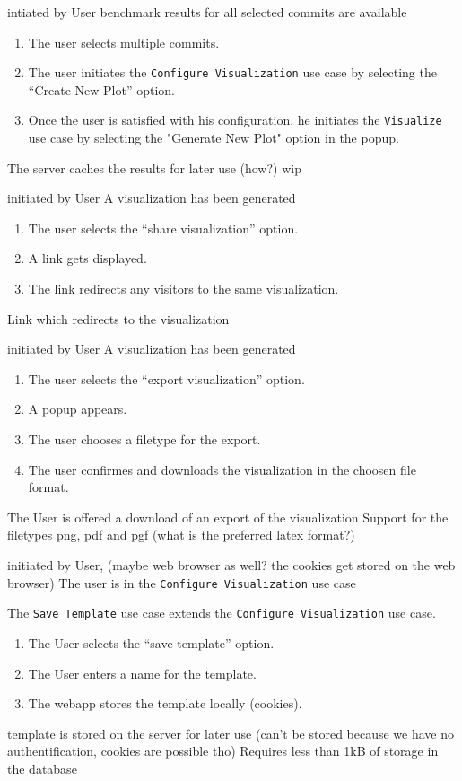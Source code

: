 \bigskip

{intiated by User}
{benchmark results for all selected commits are available}
{\begin{enumerate}
    \item The user selects multiple commits.
    \item The user initiates the \texttt{Configure Visualization} use case by selecting the \enquote{Create New Plot} option.
    \item Once the user is satisfied with his \gls{configuration}, he initiates the \texttt{Visualize} use case by selecting the "Generate New Plot" option in the popup.
\end{enumerate}}
{The server caches the results for later use (how?)}
{wip}

\bigskip

{initiated by User}
{A \gls{visualization} has been generated}
{\begin{enumerate}
    \item The user selects the \enquote{share visualization} option.
    \item A link gets displayed.
    \item The link redirects any visitors to the same visualization.
\end{enumerate}} 
{Link which redirects to the visualization}
{}

\bigskip

{initiated by User}
{A \gls{visualization} has been generated}
{\begin{enumerate}
    \item The user selects the \enquote{export visualization} option.
    \item A popup appears.
    \item The user chooses a filetype for the export.
    \item The user confirmes and downloads the visualization in the choosen file format.
\end{enumerate}} 
{The User is offered a download of an export of the visualization}
{Support for the filetypes png, pdf and pgf (what is the preferred latex format?)}

\bigskip

{initiated by User, (maybe web browser as well? the cookies get stored on the web browser)}
{The user is in the \texttt{Configure Visualization} use case}
{The \texttt{Save Template} use case extends the \texttt{Configure Visualization} use case.
\begin{enumerate}
    \item The User selects the \enquote{save template} option.
    \item The User enters a name for the \gls{template}.
    \item The webapp stores the template locally (cookies).
\end{enumerate}} 
{\Gls{template} is stored on the server for later use (can't be stored because we have no authentification, cookies are possible tho)}
{Requires less than 1kB of storage in the database}

